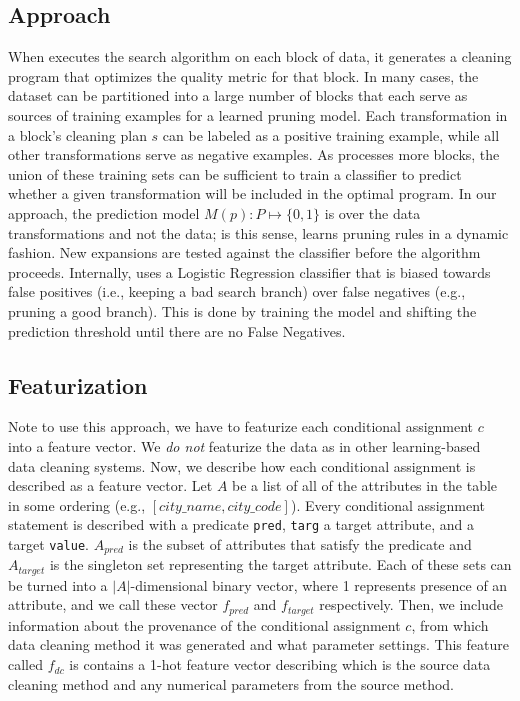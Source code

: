 \subsection{Approach}
When \sys executes the search algorithm on each block of data, it generates a cleaning program that optimizes the quality metric for that block.  In many cases, the dataset can be partitioned into a large number of blocks that each serve as sources of training examples for a learned pruning model.  Each transformation in a block's  cleaning plan $s$ can be labeled as a positive training example, while all other transformations serve as negative examples.
As \sys processes more blocks, the union of these training sets can be sufficient to train a classifier to predict whether a given transformation will be included in the optimal program.  In our approach, the prediction model $M(p): P \mapsto \{0,1\}$ is over the data transformations and not the data; is this sense, \sys learns pruning rules in a dynamic fashion. 
New expansions are tested against the classifier before the algorithm proceeds.
Internally, \sys uses a Logistic Regression classifier that is biased towards false positives (i.e., keeping a bad search branch) over false negatives (e.g., pruning a good branch). This is done by training the model and shifting the prediction threshold until there are no False Negatives. 

\subsection{Featurization}
Note to use this approach, we have to featurize each conditional assignment $c$ into a feature vector.
We \emph{do not} featurize the data as in other learning-based data cleaning systems.
Now, we describe how each conditional assignment is described as a feature vector.
Let $A$ be a list of all of the attributes in the table in some ordering (e.g., $[city\_name, city\_code]$).
Every conditional assignment statement is described with a predicate \texttt{pred}, \texttt{targ} a target attribute, and a target \texttt{value}. 
$A_{pred}$ is the subset of attributes that satisfy the predicate and $A_{target}$ is the singleton set representing the target attribute.
Each of these sets can be turned into a $|A|$-dimensional binary vector, where 1 represents presence of an attribute, and we call these vector $f_{pred}$ and $f_{target}$ respectively.
Then, we include information about the provenance of the conditional assignment $c$, from which data cleaning method it was generated and what parameter settings.
This feature called $f_{dc}$ is contains a 1-hot feature vector describing which is the source data cleaning method and any numerical parameters from the source method. 

